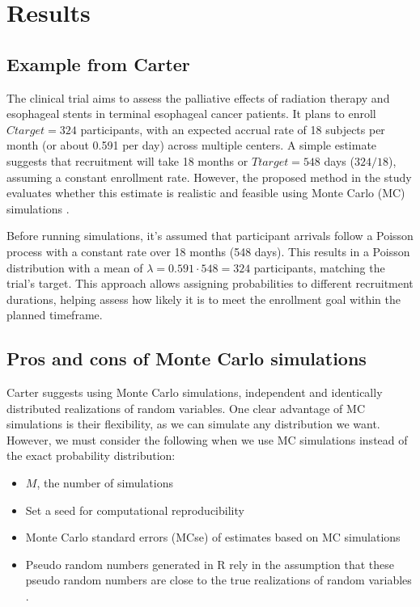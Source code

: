 




\chapter{Results}


\section{Example from Carter}

The clinical trial aims to assess the palliative effects of radiation therapy and esophageal stents in terminal esophageal cancer patients. It plans to enroll $Ctarget = 324$ participants, with an expected accrual rate of 18 subjects per month (or about 0.591 per day) across multiple centers. A simple estimate suggests that recruitment will take 18 months or $Ttarget=548$ days ($324/18$), assuming a constant enrollment rate. However, the proposed method in the study evaluates whether this estimate is realistic and feasible using Monte Carlo (MC) simulations \citep{carter2004application}.

Before running simulations, it's assumed that participant arrivals follow a Poisson process with a constant rate over 18 months (548 days). This results in a Poisson distribution with a mean of $\lambda = 0.591 \cdot 548 = 324$ participants, matching the trial's target. This approach allows assigning probabilities to different recruitment durations, helping assess how likely it is to meet the enrollment goal within the planned timeframe.


\section{Pros and cons of Monte Carlo simulations}

Carter suggests using Monte Carlo simulations, independent and identically distributed realizations of random variables. One clear advantage of MC simulations is their flexibility, as we can simulate any distribution we want. However, we must consider the following when we use MC simulations instead of the exact probability distribution:

\begin{itemize}
\item $M$, the number of simulations
\item Set a seed for computational reproducibility
\item Monte Carlo standard errors (MCse) of estimates based on MC simulations
\item Pseudo random numbers generated in R rely in the assumption that these pseudo random numbers are close to the true realizations of random variables \citep{held2014applied}.
\end{itemize}



